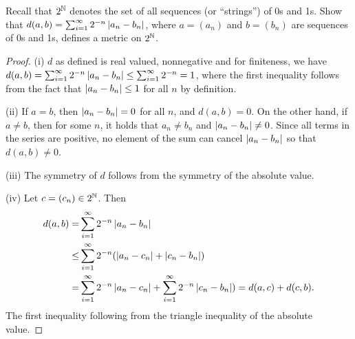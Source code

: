 \begin{exercise}{9}
Recall that $2^{\mathbb{N}}$ denotes the set of all sequences (or ``strings'') of 0s and 1s. Show that $d(a,b)=\sum_{i=1}^\infty 2^{-n}\left\lvert a_n-b_n\right\rvert$, where $a=(a_n)$ and $b=(b_n)$ are sequences of 0s and 1s, defines a metric on $2^{\mathbb{N}}$.
\end{exercise}
\begin{proof}
(i) $d$ as defined is real valued, nonnegative and for finiteness, we have $d(a,b) =\sum_{i=1}^\infty 2^{-n}\left\lvert a_n-b_n\right\rvert \leq \sum_{i=1}^\infty 2^{-n}=1$, where the first inequality follows from the fact that $\left\lvert a_n-b_n\right\rvert\leq 1$ for all $n$ by definition. 

(ii) If $a=b$, then $\left\lvert a_n-b_n\right\rvert=0$ for all $n$, and $d(a,b)=0$. On the other hand, if $a\neq b$, then for some $n$, it holds that $a_n\neq b_n$ and $\left\lvert a_n-b_n\right\rvert\neq 0$. Since all terms in the series are positive, no element of the sum can cancel $\left\lvert a_n-b_n\right\rvert$ so that $d(a,b)\neq 0$.

(iii) The symmetry of $d$ follows from the symmetry of the absolute value.

(iv) Let $c=(c_n)\in 2^{\mathbb{N}}$. Then 
\begin{align*}
    d(a,b) =&
    \sum_{i=1}^\infty 2^{-n}\left\lvert a_n-b_n\right\rvert\\
    \leq& \sum_{i=1}^\infty 2^{-n}(\left\lvert a_n-c_n\right\rvert+\left\lvert c_n-b_n\right\rvert)\\
    =& \sum_{i=1}^\infty 2^{-n}\left\lvert a_n-c_n\right\rvert
    + \sum_{i=1}^\infty2^{-n}\left\lvert c_n-b_n\right\rvert) 
    = d(a,c)+d(c,b).
\end{align*}
The first inequality following from the triangle inequality of the absolute value.
\end{proof} 

